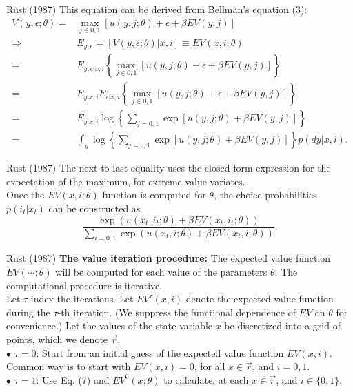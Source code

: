 \documentclass[xcolor=pdftex,dvipsnames,table,mathserif]{beamer}
\begin{document}
\begin{frame}{Rust (1987)}
This equation can be derived from Bellman's equation (3):
\begin{equation*}
\begin{split}
V(y, \epsilon ;\theta) = & \max_{j \in 0,1} [ u(y, j ; \theta) + \epsilon + \beta EV(y,j)] \\
\Longrightarrow & E_{y, \epsilon} = [V(y, \epsilon ; \theta) | x, i ] \equiv  EV(x, i ; \theta) \\
= & E_{y, \epsilon | x, i } \left \{ \max_{ j \in 0,1} [ u(y, j ; \theta) + \epsilon + \beta EV(y,j)] \right \} \\
= &  E_{y | x, i }  E_{\epsilon | x, i } \left \{ \max_{ j \in 0,1} [ u(y, j ; \theta) + \epsilon + \beta EV(y,j)] \right \} \\
= &  E_{y | x, i } \log \left \{ \sum_{j=0,1} \exp [ u(y, j ; \theta)  + \beta EV(y,j)] \right \} \\
= & \int_y \log  \left \{ \sum_{j=0,1} \exp [ u(y, j ; \theta)  + \beta EV(y,j)] \right \} p(dy|x,i).
\end{split}
\end{equation*}
\end{frame}

\begin{frame}{Rust (1987)}
The next-to-last equality uses the closed-form expression for the expectation of the maximum, for extreme-value variates.\\
\vspace{3mm}
Once the $EV(x, i ;\theta)$ function is computed for $\theta$, the choice probabilities $p(i_t |x_t)$ can be constructed as
\begin{equation*}
\frac {\exp(u(x_t, i_t ;\theta) + \beta EV (x_t, i_t; \theta))}{\sum_{i=0,1} \exp(u(x_t, i;\theta) + \beta EV(x_t, i;\theta))}.
\end{equation*}
\end{frame}

\begin{frame}{Rust (1987)}
\vspace{.5mm}
\textbf{The value iteration procedure:} The expected value function $EV(\cdots ; \theta)$ will be computed for each value of the parameters $\theta$. The computational procedure is iterative. \\
\vspace{3mm}
Let $\tau$ index the iterations. Let $EV^{\tau} (x, i)$ denote the expected value function during the $\tau$-th iteration. (We suppress the functional dependence of $EV$ on $\theta$ for convenience.) Let the values of the state variable $x$ be discretized into a grid of points, which we denote $\vec r$. \\
\vspace{3mm}
$\bullet$ $\tau = 0$: Start from an initial guess of the expected value function $EV(x, i)$. Common way is to start with $EV(x, i) = 0$, for all $x \in \vec r$, and $i=0,1$. \\
$\bullet$ $\tau =1$: Use Eq. (7) and $EV^0 (x; \theta)$ to calculate, at each $x \in \vec r$, and $i \in \{0, 1\}$. 
\end{frame}
\end{document}

